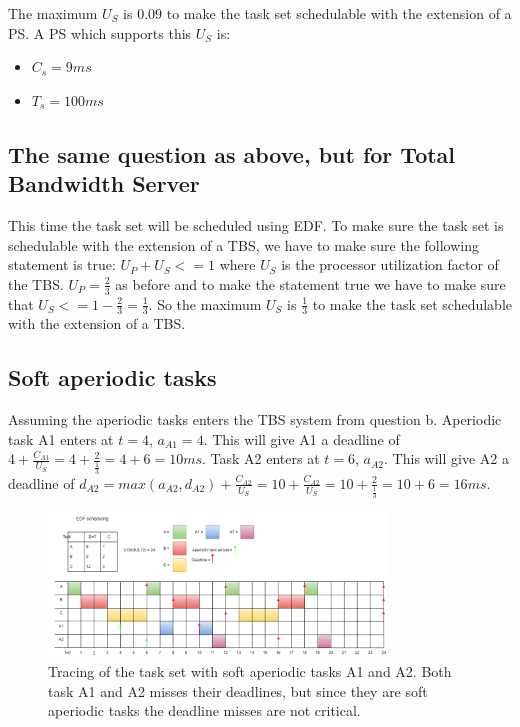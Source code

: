         The maximum $U_S$ is $0.09$ to make the task set schedulable with the extension of a PS. A PS which supports this $U_S$ is:
        \begin{itemize}
            \item $C_s = 9ms$
            \item $T_s = 100ms$
        \end{itemize}

    \subsection{The same question as above, but for Total Bandwidth Server}
        
        This time the task set will be scheduled using EDF. To make sure the task set is schedulable with the extension of a TBS, we have to make sure the following statement is true: $U_P + U_S <= 1$ where $U_S$ is the processor utilization factor of the TBS. $U_P = \frac{2}{3}$ as before and to make the statement true we have to make sure that $U_S <= 1 - \frac{2}{3} = \frac{1}{3}$. So the maximum $U_S$ is $\frac{1}{3}$ to make the task set schedulable with the extension of a TBS.

    \subsection{Soft aperiodic tasks}
        
        Assuming the aperiodic tasks enters the TBS system from question b. Aperiodic task A1 enters at $t=4$, $a_{A1} = 4$. This will give A1 a deadline of $4 + \frac{C_{A1}}{U_S} = 4 + \frac{2}{\frac{1}{3}} = 4 + 6 = 10ms$. Task A2 enters at $t=6$, $a_{A2}$. This will give A2 a deadline of $d_{A2} = max(a_{A2}, d_{A2}) + \frac{C_{A2}}{U_S} = 10 + \frac{C_{A2}}{U_S} = 10 + \frac{2}{\frac{1}{3}} = 10 + 6 = 16ms$.

        \begin{figure}[H]
            \centering
            \includegraphics[width=0.8\textwidth]{images/Ass1Q8c.png}
            \caption{Tracing of the task set with soft aperiodic tasks A1 and A2. Both task A1 and A2 misses their deadlines, but since they are soft aperiodic tasks the deadline misses are not critical.}
            \label{fig:Q8trace}
        \end{figure}